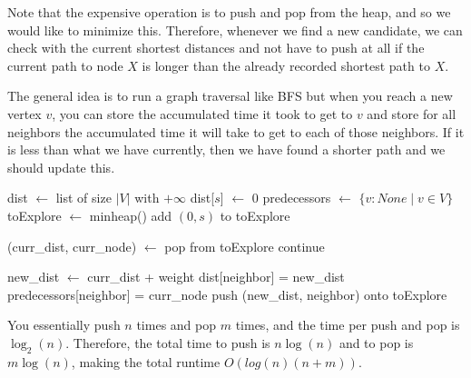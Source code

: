   Note that the expensive operation is to push and pop from the heap, and so we would like to minimize this. Therefore, whenever we find a new candidate, we can check with the current shortest distances and not have to push at all if the current path to node $X$ is longer than the already recorded shortest path to $X$. 

  \begin{algo}
    The general idea is to run a graph traversal like BFS but when you reach a new vertex $v$, you can store the accumulated time it took to get to $v$ and store for all neighbors the accumulated time it will take to get to each of those neighbors. If it is less than what we have currently, then we have found a shorter path and we should update this. 
    \begin{algorithm}[H]
      \label{alg:dijkstra}
      \begin{algorithmic}[1]
          \State dist $\gets$ list of size $|V|$ with $+\infty$ 
          \State dist[$s$] $\gets$ 0 
          \State predecessors $\gets$ $\{v : None \mid v \in V \}$ 
          \State toExplore $\gets$ minheap() 
          \State add $(0, s)$ to toExplore 

          \State (curr\_dist, curr\_node) $\gets$ pop from toExplore  
              
              \State continue 
            \EndIf 

             
              \State new\_dist $\gets$ curr\_dist + weight 
               
                \State dist[neighbor] = new\_dist 
                \State predecessors[neighbor] = curr\_node 
                \State push (new\_dist, neighbor) onto toExplore 
              \EndIf
            \EndFor
          \EndWhile
          \State {}
        \EndFunction
      \end{algorithmic}
    \end{algorithm}

    You essentially push $n$ times and pop $m$ times, and the time per push and pop is $\log_2 (n)$. Therefore, the total time to push is $n \log(n)$ and to pop is $m \log (n)$, making the total runtime $O(log(n) (n+m))$. 
  \end{algo}

